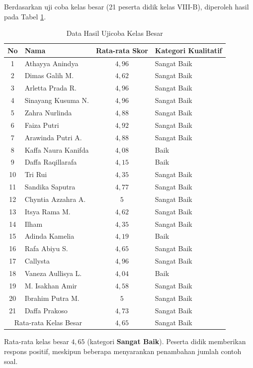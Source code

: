 \begin{enumerate}
    \hspace*{1cm}Berdasarkan uji coba kelas besar (21 peserta didik kelas VIII-B), diperoleh hasil pada Tabel \ref{ujikelasbesar}.
    \begin{table}[H]
        \centering
        \caption{Data Hasil Ujicoba Kelas Besar}
        \label{ujikelasbesar}
        \begin{tabular}{|c|l|c|l|}
            \hline
            \textbf{No} & \textbf{Nama} & \textbf{Rata-rata Skor} & \textbf{Kategori Kualitatif} \\
            \hline
            1 & Athayya Anindya & \(4{,}96\) & Sangat Baik \\
            2 & Dimas Galih M. & \(4{,}62\) & Sangat Baik \\
            3 & Arletta Prada R. & \(4{,}96\) & Sangat Baik \\
            4 & Sinayang Kusuma N. & \(4{,}96\) & Sangat Baik \\
            5 & Zahra Nurlinda & \(4{,}88\) & Sangat Baik \\
            6 & Faiza Putri & \(4{,}92\) & Sangat Baik \\
            7 & Arawinda Putri A. & \(4{,}88\) & Sangat Baik \\
            8 & Kaffa Naura Kanifda & \(4{,}08\) & Baik \\
            9 & Daffa Raqillarafa & \(4{,}15\) & Baik \\
            10 & Tri Rui & \(4{,}35\) & Sangat Baik \\
            11 & Sandika Saputra & \(4{,}77\) & Sangat Baik \\
            12 & Chyntia Azzahra A. & \(5\) & Sangat Baik \\
            13 & Itsya Rama M. & \(4{,}62\) & Sangat Baik \\
            14 & Ilham & \(4{,}35\) & Sangat Baik \\
            15 & Adinda Kamelia & \(4{,}19\) & Baik \\
            16 & Rafa Abiyu S. & \(4{,}65\) & Sangat Baik \\
            17 & Callysta & \(4{,}96\) & Sangat Baik \\
            18 & Vaneza Aullisya L. & \(4{,}04\) & Baik \\
            19 & M. Isakhan Amir & \(4{,}58\) & Sangat Baik \\
            20 & Ibrahim Putra M. & \(5\) & Sangat Baik \\
            21 & Daffa Prakoso & \(4{,}73\) & Sangat Baik \\
            \hline
            \multicolumn{2}{|c|}{Rata-rata Kelas Besar} & \(4{,}65\) & Sangat Baik \\
            \hline
        \end{tabular}
    \end{table}
    Rata-rata kelas besar \(4{,}65\) (kategori \textbf{Sangat Baik}). Peserta didik memberikan respons positif, meskipun beberapa menyarankan penambahan jumlah contoh soal.


\end{enumerate}
